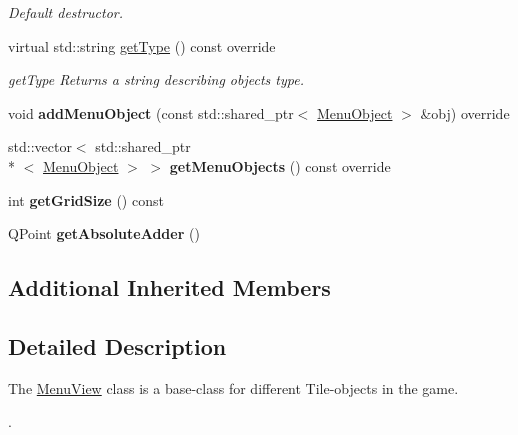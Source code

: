 \begin{DoxyCompactItemize}
\begin{DoxyCompactList}\small\item\em Default destructor. \end{DoxyCompactList}\item 
virtual std\-::string \hyperlink{class_student_1_1_menu_view_a6c9f9c66b86d2772115e0bbb50a977bc}{get\-Type} () const override
\begin{DoxyCompactList}\small\item\em get\-Type Returns a string describing objects type. \end{DoxyCompactList}\item 
\hypertarget{class_student_1_1_menu_view_a67a67f296a374529683fb7bdc1a2f8e3}{void {\bfseries add\-Menu\-Object} (const std\-::shared\-\_\-ptr$<$ \hyperlink{class_student_1_1_menu_object}{Menu\-Object} $>$ \&obj) override}\label{class_student_1_1_menu_view_a67a67f296a374529683fb7bdc1a2f8e3}

\item 
\hypertarget{class_student_1_1_menu_view_ae89226f835d461820e2195f3f9220152}{std\-::vector$<$ std\-::shared\-\_\-ptr\\*
$<$ \hyperlink{class_student_1_1_menu_object}{Menu\-Object} $>$ $>$ {\bfseries get\-Menu\-Objects} () const override}\label{class_student_1_1_menu_view_ae89226f835d461820e2195f3f9220152}

\item 
\hypertarget{class_student_1_1_menu_view_a9f5294f9dfa4ca247b73a34b55fb26ba}{int {\bfseries get\-Grid\-Size} () const }\label{class_student_1_1_menu_view_a9f5294f9dfa4ca247b73a34b55fb26ba}

\item 
\hypertarget{class_student_1_1_menu_view_a2f5b48e75433452b425ec51b4d83e41d}{Q\-Point {\bfseries get\-Absolute\-Adder} ()}\label{class_student_1_1_menu_view_a2f5b48e75433452b425ec51b4d83e41d}

\end{DoxyCompactItemize}
\subsection*{Additional Inherited Members}


\subsection{Detailed Description}
The \hyperlink{class_student_1_1_menu_view}{Menu\-View} class is a base-\/class for different Tile-\/objects in the game. \par
. 

